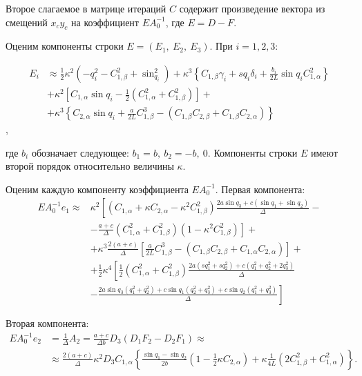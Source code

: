Второе слагаемое в матрице итераций $C$ содержит произведение вектора из смещений $x_cy_c$ на коэффициент $EA_0^{-1}$, где $E = D - F$.

Оценим компоненты строки $E = \left(E_1,~E_2,~E_3\right)$. При $i=1,2,3$:

\begin{equation}
\begin{aligned}
	E_i & \approx \frac{1}{2}\kappa^2 \left(-q^2_i - C^2_{1,\beta} + \sin^2_{q_i}\right) + \kappa^3 \left\lbrace C_{1,\beta}\gamma_i + sq_i\delta_i + \frac{b_i}{2L}\sin{q_i}C^2_{1,\alpha} \right\rbrace \\
	& + \kappa^2\left[C_{1,\alpha}\sin{q_i} - \frac{1}{2}\left(C^2_{1,\alpha} + C^2_{1,\beta}\right)\right] + \\
	& + \kappa^3\left\lbrace C_{2,\alpha}\sin{q_i} + \frac{a}{2L}C^3_{1,\beta} - \left(C_{1,\beta}C_{2,\beta} + C_{1,\beta}C_{2,\alpha}\right)\right\rbrace
\end{aligned}
\end{equation},

где $b_i$ обозначает следующее: $b_1 = b,~b_2 = -b,~0$. Компоненты строки $E$ имеют второй порядок относительно величины $\kappa$.

Оценим каждую компоненту коэффициента $EA^{-1}_0$. Первая компонента:
\begin{equation}
\begin{aligned}
EA^{-1}_0e_1 \approx & \kappa^2\left[\left(C_{1,\alpha} + \kappa C_{2,\alpha} - \kappa^2 C^2_{1,\beta}\right)\frac{2a\sin{q_3} + c\left(\sin{q_1} + \sin{q_2}\right)}{\Delta} - \right.\\
&\left. - \frac{a+c}{\Delta}\left(C^2_{1,\alpha} + C^2_{1,\beta}\right)\left(1 - \kappa^2 C^2_{1,\beta}\right)\right] + \\
& + \kappa^3\frac{2\left(a+c\right)}{\Delta} \left[\frac{a}{2L}C^3_{1,\beta} - \left(C_{1,\beta}C_{2,\beta} + C_{1,\alpha}C_{2,\alpha}\right)\right] + \\
& + \frac{1}{2}\kappa^4\left[ \frac{1}{2}\left(C^2_{1,\alpha} + C^2_{1,\beta}\right) \frac{2a\left(sq^2_1 + sq^2_2\right) + c\left(q^2_1 + q^2_2 + 2q^2_3\right)}{\Delta}\right. \\
& -\left. \frac{2a\sin{q_3}\left(q^2_1 + q^2_2\right) + c\sin{q_1}\left(q^2_2 + q^2_3\right) + c\sin{q_2}\left(q^2_1 + q^2_3\right)}{\Delta} \right]
\end{aligned}
\end{equation}

Вторая компонента:
\begin{equation}
\begin{aligned}
EA^{-1}_0 e_2 & = \frac{1}{\Delta}A_2 = \frac{a+c}{\Delta b}D_3\left(D_1F_2 - D_2F_1\right) \approx\\
& \approx \frac{2\left(a+c\right)}{\Delta}\kappa^2D_3C_{1,\alpha}\left\lbrace \frac{\sin{q_1} - \sin{q_2}}{2b}\left(1 - \frac{1}{2}\kappa C_{2,\alpha}\right) + \kappa \frac{1}{4L}\left(2C^2_{1,\beta} + C^2_{1,\alpha}\right)\right\rbrace.
\end{aligned}
\end{equation}

